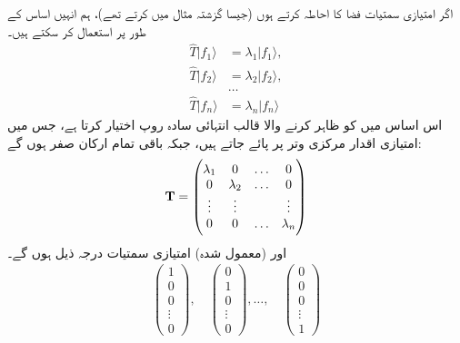 اگر امتیازی سمتیات فضا کا احاطہ کرتے ہوں (جیسا گزشتہ مثال میں کرتے تھے)،   ہم انہیں اساس کے طور پر استعمال کر سکتے ہیں۔
\begin{align*}
	\hat{T}| f_1\rangle &= \lambda_1| f_1\rangle,\\
	\hat{T}| f_2\rangle &= \lambda_2| f_2\rangle,\\
	&\dots\\
	\hat{T}| f_n\rangle &= \lambda_n| f_n\rangle
\end{align*}
اس اساس میں  کو ظاہر کرنے والا قالب انتہائی سادہ روپ اختیار کرتا ہے،  جس میں امتیازی اقدار مرکزی وتر پر پائے جاتے ہیں، جبکہ باقی تمام ارکان صفر ہوں گے:
\begin{align}\label{مساوات_ضمیمہ_وتری_قالب}
	\operatorname{\mathbf{T}}=
	\begin{pmatrix}
		\lambda_1 & 0 & \dots & 0\\
		0 & \lambda_2 & \dots & 0\\
		\vdots & \vdots & & \vdots\\
		0 & 0 & \dots & \lambda_n
	\end{pmatrix}
\end{align}
اور  (معمول شدہ)  امتیازی سمتیات درجہ ذیل ہوں گے۔
\begin{align}
	\begin{pmatrix}
		1\\0\\0\\ \vdots\\0
	\end{pmatrix}
	,\quad 
	\begin{pmatrix}
		0\\1\\0\\\vdots\\0
	\end{pmatrix}
	, \dots,\quad 
	\begin{pmatrix}
		0\\0\\0\\\vdots\\1
	\end{pmatrix}
\end{align}

